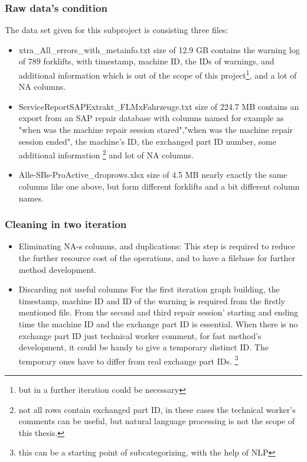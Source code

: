 		\subsubsection{Raw data's condition}
		The data set given for this subproject is consisting three files:
		\begin{itemize}
			\item{xtra\_All\_errors\_with\_metainfo.txt} size of 12.9 GB contains the warning log of 789 forklifts, with timestamp, machine ID, the IDs of warnings, and additional information which is out of the scope of this project\footnote{but in a further iteration could be necessary}, and a lot of NA columns.
			\item{ServiceReportSAPExtrakt\_FLMxFahrzeuge.txt} size of 224.7 MB contains an export from an SAP repair database with columns named for example as "when was the machine repair session stared","when was the machine repair session ended", the machine's ID, the exchanged part ID number, some additional information \footnote{not all rows contain exchanged part ID, in these cases the technical worker's comments can be useful, but natural language processing is not the scope of this thesis.} and lot of NA columns.
			\item{Alle-SBs-ProActive\_droprows.xlsx} size of 4.5 MB nearly exactly the same columns like one above, but form different forklifts and a bit different column names.
		\end{itemize}
		\subsubsection{Cleaning in two iteration}
		\begin{itemize}
			\item{Eliminating NA-s columns, and duplications:} This step is required to reduce the further resource cost of the operations, and to have a filebase for further method development.
			\item{Discarding not useful columns} For the first iteration graph building, the timestamp, machine ID and ID of the warning is required from the firstly mentioned file. From the second and third repair session' starting and ending time the machine ID and the exchange part ID is essential. When there is no exchange part ID just technical worker comment, for fast method's development, it could be handy to give a temporary distinct ID. The temporary ones have to differ from real exchange part IDs. \footnote{this can be a starting point of subcategorizing, with the help of NLP} 
		\end{itemize}
